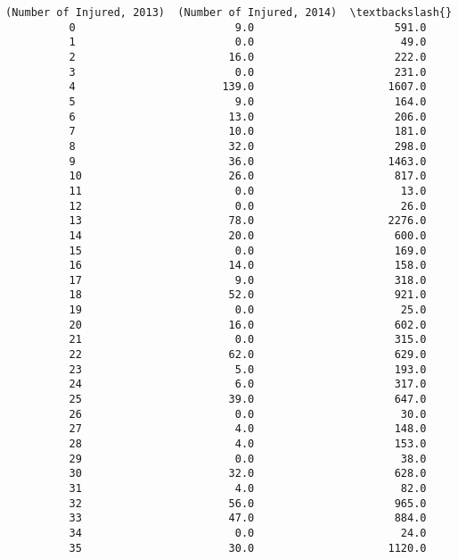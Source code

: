 \documentclass[11pt]{article}
\begin{document}
\begin{Verbatim}[commandchars=\\\{\}]
              (Number of Injured, 2013)  (Number of Injured, 2014)  \textbackslash{}
          0                         9.0                      591.0   
          1                         0.0                       49.0   
          2                        16.0                      222.0   
          3                         0.0                      231.0   
          4                       139.0                     1607.0   
          5                         9.0                      164.0   
          6                        13.0                      206.0   
          7                        10.0                      181.0   
          8                        32.0                      298.0   
          9                        36.0                     1463.0   
          10                       26.0                      817.0   
          11                        0.0                       13.0   
          12                        0.0                       26.0   
          13                       78.0                     2276.0   
          14                       20.0                      600.0   
          15                        0.0                      169.0   
          16                       14.0                      158.0   
          17                        9.0                      318.0   
          18                       52.0                      921.0   
          19                        0.0                       25.0   
          20                       16.0                      602.0   
          21                        0.0                      315.0   
          22                       62.0                      629.0   
          23                        5.0                      193.0   
          24                        6.0                      317.0   
          25                       39.0                      647.0   
          26                        0.0                       30.0   
          27                        4.0                      148.0   
          28                        4.0                      153.0   
          29                        0.0                       38.0   
          30                       32.0                      628.0   
          31                        4.0                       82.0   
          32                       56.0                      965.0   
          33                       47.0                      884.0   
          34                        0.0                       24.0   
          35                       30.0                     1120.0   

\end{Verbatim}
\end{document}
